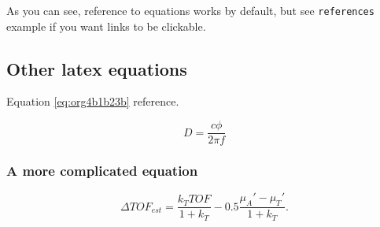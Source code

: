 As you can see, reference to equations works by default, but see \texttt{references}
example if you want links to be clickable.

\subsection{Other latex equations}
\label{sec:orgf0fcc1f}
Equation \ref{eq:org4b1b23b} reference.

\begin{equation}
\label{eq:org4b1b23b}
D = \frac{c\phi}{2\pi f}
\end{equation}

\subsubsection{A more complicated equation}
\label{sec:orge5fab64}

\begin{equation}
\Delta TOF_{est} = \frac{k_T TOF}{1+k_T } - 0.5 \frac{\mu_A' - \mu_T'}{1+k_T}.
\end{equation}


